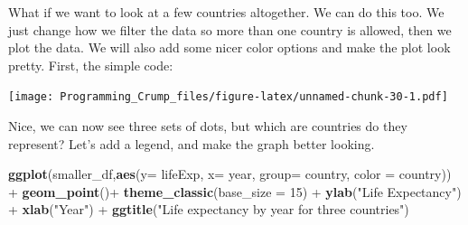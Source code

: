 \documentclass[]{book}
\newenvironment{Shaded}{\begin{snugshade}}{\end{snugshade}}
\newcommand{\KeywordTok}[1]{\textcolor[rgb]{0.13,0.29,0.53}{\textbf{{#1}}}}
\newcommand{\DataTypeTok}[1]{\textcolor[rgb]{0.13,0.29,0.53}{{#1}}}
\newcommand{\DecValTok}[1]{\textcolor[rgb]{0.00,0.00,0.81}{{#1}}}
\newcommand{\StringTok}[1]{\textcolor[rgb]{0.31,0.60,0.02}{{#1}}}
\newcommand{\CommentTok}[1]{\textcolor[rgb]{0.56,0.35,0.01}{\textit{{#1}}}}
\newcommand{\OtherTok}[1]{\textcolor[rgb]{0.56,0.35,0.01}{{#1}}}
\newcommand{\NormalTok}[1]{{#1}}
\theoremstyle{definition}
\theoremstyle{definition}
\theoremstyle{definition}
\theoremstyle{remark}
\begin{document}
What if we want to look at a few countries altogether. We can do this
too. We just change how we filter the data so more than one country is
allowed, then we plot the data. We will also add some nicer color
options and make the plot look pretty. First, the simple code:

\begin{Shaded}
\end{Shaded}

\texttt{[image: Programming\_Crump\_files/figure-latex/unnamed-chunk-30-1.pdf]}

Nice, we can now see three sets of dots, but which are countries do they
represent? Let's add a legend, and make the graph better looking.

\begin{Shaded}
\begin{Highlighting}[]
\KeywordTok{ggplot}\NormalTok{(smaller_df,}\KeywordTok{aes}\NormalTok{(}\DataTypeTok{y=} \NormalTok{lifeExp, }\DataTypeTok{x=} \NormalTok{year, }
                      \DataTypeTok{group=} \NormalTok{country, }\DataTypeTok{color =} \NormalTok{country)) +}
\StringTok{  }\KeywordTok{geom_point}\NormalTok{()+}\StringTok{ }
\StringTok{  }\KeywordTok{theme_classic}\NormalTok{(}\DataTypeTok{base_size =} \DecValTok{15}\NormalTok{) +}
\StringTok{  }\KeywordTok{ylab}\NormalTok{(}\StringTok{"Life Expectancy"}\NormalTok{) +}\StringTok{ }
\StringTok{  }\KeywordTok{xlab}\NormalTok{(}\StringTok{"Year"}\NormalTok{) +}
\StringTok{  }\KeywordTok{ggtitle}\NormalTok{(}\StringTok{"Life expectancy by year for three countries"}\NormalTok{)}
\end{Highlighting}
\end{Shaded}
\end{document}
